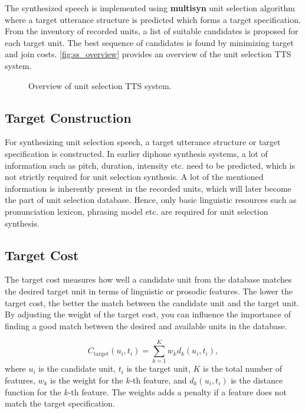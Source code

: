 \documentclass[lettersize,journal]{IEEEtran}
\begin{document}
The synthesized speech is implemented using \textbf{multisyn} unit selection algorithm \cite{multisyn} where a target utterance structure is predicted which forms a target specification. From the inventory of recorded units, a list of suitable candidates is proposed for each target unit. The best sequence of candidates is found by minimizing target and join costs. \autoref{fig:ss_overview} provides an overview of the unit selection TTS system.

\begin{figure}[!htbp]
    \centering 
    \caption{Overview of unit selection TTS system.}
    \label{fig:ss_overview}
\end{figure}



\subsection{Target Construction}

For synthesizing unit selection speech, a target utterance structure or target specification is constructed. In earlier diphone synthesis systems, a lot of information such as pitch, duration, intensity etc. need to be predicted, which is not strictly required for unit selection synthesis. A lot of the mentioned information is inherently present in the recorded units, which will later become the part of unit selection database. Hence, only basic linguistic resources such as pronunciation lexicon, phrasing model etc. are required for unit selection synthesis.

\subsection{Target Cost}

 The target cost measures how well a candidate unit from the database matches the desired target unit in terms of linguistic or prosodic features. The lower the target cost, the better the match between the candidate unit and the target unit. By adjusting the weight of the target cost, you can influence the importance of finding a good match between the desired and available units in the database. 

\begin{equation}
  C_{\text{target}}(u_i, t_i) = \sum_{k=1}^{K} w_k d_k(u_i, t_i),
\end{equation}
where $u_i$ is the candidate unit, $t_i$ is the target unit, $K$ is the total number of features, $w_k$ is the weight for the $k$-th feature, and $d_k(u_i, t_i)$ is the distance function for the $k$-th feature. The weights adds a penalty if a feature does not match the target specification.
\end{document}
